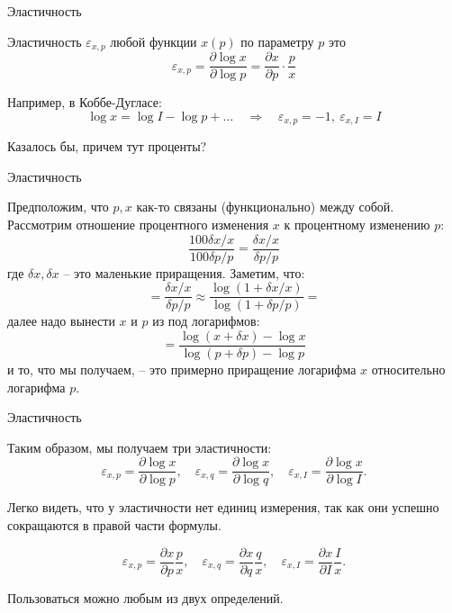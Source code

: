 \documentclass{beamer}
\begin{document}
\begin{frame}{Эластичность}

\begin{definition}
\alert{Эластичность} $\varepsilon_{x,p}$ любой функции $x(p)$ по параметру $p$ это 
$$ \varepsilon_{x,p} = \frac{\partial \log x}{\partial \log p} = \frac{\partial x}{\partial p} \cdot \frac{p}{x}$$	
\end{definition}

Например, в Коббе-Дугласе:
$$\log x = \log I - \log p + \ldots \quad \Rightarrow \quad \varepsilon_{x,p} = -1, \ \varepsilon_{x,I} = I $$

Казалось бы, причем тут проценты?

\end{frame}

\begin{frame}{Эластичность}

Предположим, что $p,x$ как-то связаны (функционально) между собой. Рассмотрим отношение процентного изменения $x$ к процентному изменению $p$:
$$\frac{100 \delta x / x}{100 \delta p / p}=\frac{\delta x / x}{\delta p / p}$$
где $\delta x, \delta x$ – это маленькие приращения. Заметим, что:
$$=\frac{\delta x / x}{\delta p / p} \approx \frac{\log(1 + \delta x / x)}{\log(1 + \delta p / p)}=$$
далее надо вынести $x$ и $p$ из под логарифмов:
$$=\frac{\log(x + \delta x) - \log x}{\log(p + \delta p) - \log p}$$
и то, что мы получаем, – это примерно приращение логарифма $x$ относительно логарифма $p$.

\end{frame}

\begin{frame}{Эластичность}

Таким образом, мы получаем три эластичности:
$$\varepsilon_{x,p} = \frac{\partial \log x}{\partial \log p}, \quad \varepsilon_{x,q} = \frac{\partial \log x}{\partial \log q}, \quad \varepsilon_{x,I} = \frac{\partial \log x}{\partial \log I}.$$

Легко видеть, что у эластичности нет единиц измерения, так как они успешно сокращаются в правой части формулы. 

$$\varepsilon_{x,p} = \frac{\partial x}{\partial p}\frac{p}{x}, \quad \varepsilon_{x,q} = \frac{\partial x}{\partial q}\frac{q}{x}, \quad \varepsilon_{x,I} = \frac{\partial x}{\partial I}\frac{I}{x}.$$

Пользоваться можно любым из двух определений.

\end{frame}
\end{document}
